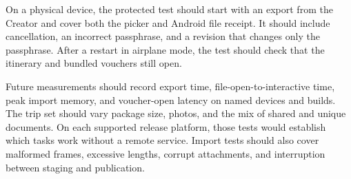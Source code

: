 On a physical device, the protected test should start with an export from the Creator and cover both the picker and Android file receipt. It should include cancellation, an incorrect passphrase, and a revision that changes only the passphrase. After a restart in airplane mode, the test should check that the itinerary and bundled vouchers still open.

Future measurements should record export time, file-open-to-interactive time, peak import memory, and voucher-open latency on named devices and builds. The trip set should vary package size, photos, and the mix of shared and unique documents. On each supported release platform, those tests would establish which tasks work without a remote service. Import tests should also cover malformed frames, excessive lengths, corrupt attachments, and interruption between staging and publication.
